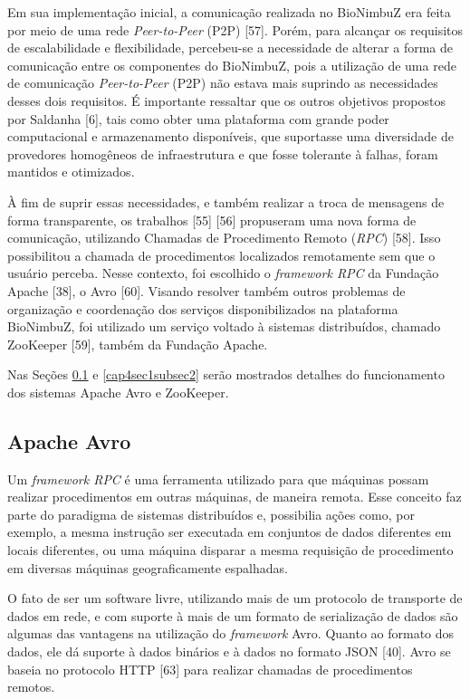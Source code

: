 Em sua implementação inicial, a comunicação realizada no BioNimbuZ era feita por meio de uma rede \textit{Peer-to-Peer} (P2P) [57]. Porém, para alcançar os requisitos de escalabilidade e flexibilidade, percebeu-se a necessidade de alterar a forma de comunicação entre os componentes do BioNimbuZ, pois a utilização de uma rede de comunicação \textit{Peer-to-Peer} (P2P) não estava mais suprindo as necessidades desses dois requisitos. É importante ressaltar que os outros objetivos propostos por Saldanha [6], tais como obter uma plataforma com grande poder computacional e armazenamento disponíveis, que suportasse uma diversidade de provedores homogêneos de infraestrutura e que fosse tolerante à falhas, foram mantidos e otimizados.

À fim de suprir essas necessidades, e também realizar a troca de mensagens de forma transparente, os trabalhos [55] [56] propuseram uma nova forma de comunicação, utilizando Chamadas de Procedimento Remoto (\textit{RPC}) [58]. Isso possibilitou a chamada de procedimentos localizados remotamente sem que o usuário perceba. Nesse contexto, foi escolhido o \textit{framework RPC} da Fundação Apache [38], o Avro [60]. Visando resolver também outros problemas de organização e coordenação dos serviços disponibilizados na plataforma BioNimbuZ, foi utilizado um serviço voltado à sistemas distribuídos, chamado ZooKeeper [59], também da Fundação Apache. 

Nas Seções \ref{cap4sec1subsec1} e \ref{cap4sec1subsec2} serão mostrados detalhes do funcionamento dos sistemas Apache Avro e ZooKeeper.

\subsection{Apache Avro} \label{cap4sec1subsec1}

Um \textit{framework RPC} é uma ferramenta utilizado para que máquinas possam realizar procedimentos em outras máquinas, de maneira remota. Esse conceito faz parte do paradigma de sistemas distribuídos e, possibilia ações como, por exemplo, a mesma instrução ser executada em conjuntos de dados diferentes em locais diferentes, ou uma máquina disparar a mesma requisição de procedimento em diversas máquinas geograficamente espalhadas.

O fato de ser um software livre, utilizando mais de um protocolo de transporte de dados em rede, e com suporte à mais de um formato de serialização de dados são algumas das vantagens na utilização do \textit{framework} Avro. Quanto ao formato dos dados, ele dá suporte à dados binários e à dados no formato JSON [40]. Avro se baseia no protocolo HTTP [63] para realizar chamadas de procedimentos remotos.

